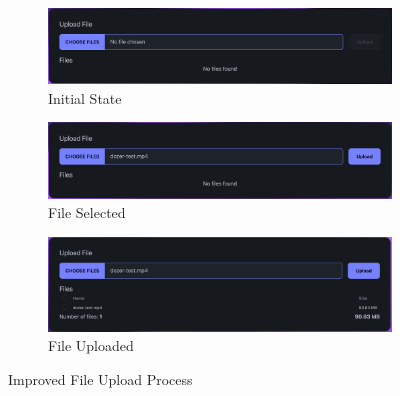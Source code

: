 \begin{figure}[htb]
  \begin{subfigure}{\textwidth}
    \centering
    \includegraphics[width=.65\linewidth]{figures/fix-4.1.png}
    \caption{Initial State}
  \end{subfigure}
  \begin{subfigure}{\textwidth}
    \centering
    \includegraphics[width=.65\linewidth]{figures/fix-4.2.png}
    \caption{File Selected}
  \end{subfigure}
  \begin{subfigure}{\textwidth}
    \centering
    \includegraphics[width=.65\linewidth]{figures/fix-4.3.png}
    \caption{File Uploaded}
  \end{subfigure}
	\caption{Improved File Upload Process}
  \label{fig:fix-4}
\end{figure}
